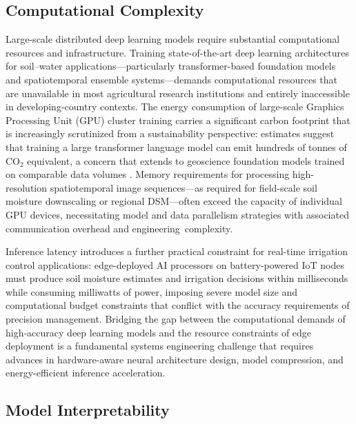 \documentclass[land,review,accept,pdftex,oneauthor]{Definitions/mdpi}
\begin{document}
\subsection{Computational Complexity}

Large-scale distributed deep learning models require substantial computational resources and infrastructure. Training state-of-the-art deep learning architectures for soil--water applications---particularly transformer-based foundation models and spatiotemporal ensemble systems---demands computational resources that are unavailable in most agricultural research institutions and entirely inaccessible in developing-country contexts. The energy consumption of large-scale {Graphics Processing Unit (}GPU{)} cluster training carries a significant carbon footprint that is increasingly scrutinized from a sustainability perspective: estimates suggest that training a large transformer language model can emit hundreds of tonnes of CO$_2$ equivalent, a concern that extends to geoscience foundation models trained on comparable data volumes \citep{schwartz2020green}. Memory requirements for processing high-resolution spatiotemporal image sequences---as required for field-scale soil moisture downscaling or regional DSM---often exceed the capacity of individual GPU devices, necessitating model and data parallelism strategies with associated communication overhead and engineering~complexity.

Inference latency introduces a further practical constraint for real-time irrigation control applications: edge-deployed AI processors on battery-powered IoT nodes must produce soil moisture estimates and irrigation decisions within milliseconds while consuming milliwatts of power, imposing severe model size and computational budget constraints that conflict with the accuracy requirements of precision management. Bridging the gap between the computational demands of high-accuracy deep learning models and the resource constraints of edge deployment is a fundamental systems engineering challenge that requires advances in hardware-aware neural architecture design, model compression, and energy-efficient inference acceleration.

\subsection{Model Interpretability}
\end{document}

